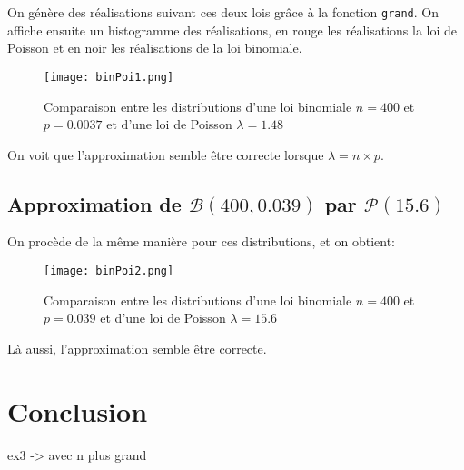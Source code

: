 \documentclass{article}
\begin{document}
\begin{multicols}{2}
On génère des réalisations suivant ces deux lois grâce à la fonction
\texttt{grand}. On affiche ensuite un histogramme des réalisations, en rouge les
réalisations la loi de Poisson et en noir les réalisations de la loi binomiale.

\begin{figure}[H]
    \begin{center}
        \texttt{[image: binPoi1.png]}
        \centering
        \captionsetup{justification=centering}
        \caption{\label{fig:binPoi1}Comparaison entre les distributions d'une loi binomiale $n = 400$ et $p = 0.0037$ et d'une loi de Poisson $\lambda = 1.48$}
    \end{center}
\end{figure}

On voit que l'approximation semble être correcte lorsque $\lambda = n \times p$.

\subsection{Approximation de $\mathcal{B}(400, 0.039)$ par $\mathcal{P}(15.6)$}\label{subsec:ex31}

On procède de la même manière pour ces distributions, et on obtient:

\begin{figure}[H]
    \begin{center}
        \texttt{[image: binPoi2.png]}
        \centering
        \captionsetup{justification=centering}
        \caption{\label{fig:binPoi2}Comparaison entre les distributions d'une loi binomiale $n = 400$ et $p = 0.039$ et d'une loi de Poisson $\lambda = 15.6$}
    \end{center}
\end{figure}

Là aussi, l'approximation semble être correcte.


\section{Conclusion}\label{sec:conclu}

ex3 -> avec n plus grand



\end{multicols}
\end{document}
